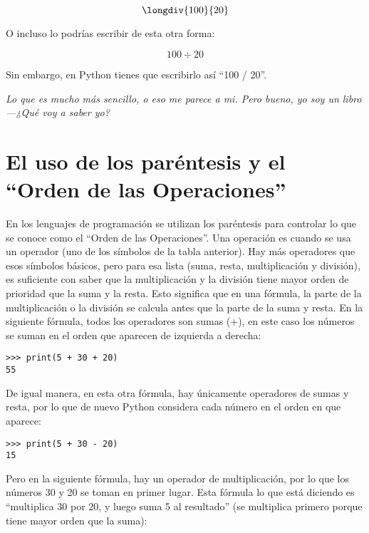 \begin{displaymath}
\longdiv{100}{20}
\end{displaymath}

O incluso lo podrías escribir de esta otra forma:

\begin{displaymath}
100 \div 20
\end{displaymath}

Sin embargo, en Python tienes que escribirlo así ``100 / 20''.

\emph{Lo que es mucho más sencillo, o eso me parece a mi.  Pero bueno, yo soy un libro---¿Qué voy a saber yo?}

\section{El uso de los paréntesis y el ``Orden de las Operaciones''}

En los lenguajes de programación se utilizan los paréntesis para controlar lo que se conoce como el ``Orden de las Operaciones''.  Una operación es cuando se usa un operador (uno de los símbolos de la tabla anterior).  Hay más operadores que esos símbolos básicos, pero para esa lista (suma, resta, multiplicación y división), es suficiente con saber que la multiplicación y la división tiene mayor orden de prioridad que la suma y la resta. Esto significa que en una fórmula, la parte de la multiplicación o la división se calcula antes que la parte de la suma y resta.  En la siguiente fórmula, todos los operadores son sumas (+), en este caso los números se suman en el orden que aparecen de izquierda a derecha:

\begin{listing}
\begin{verbatim}
>>> print(5 + 30 + 20)
55
\end{verbatim}
\end{listing}

\noindent
De igual manera, en esta otra fórmula, hay únicamente operadores de sumas y resta, por lo que de nuevo Python considera cada número en el orden en que aparece:

\begin{listing}
\begin{verbatim}
>>> print(5 + 30 - 20)
15
\end{verbatim}
\end{listing}

\noindent
Pero en la siguiente fórmula, hay un operador de multiplicación, por lo que los números 30 y 20 se toman en primer lugar. Esta fórmula lo que está diciendo es ``multiplica 30 por 20, y luego suma 5 al resultado'' (se multiplica primero porque tiene mayor orden que la suma): 

